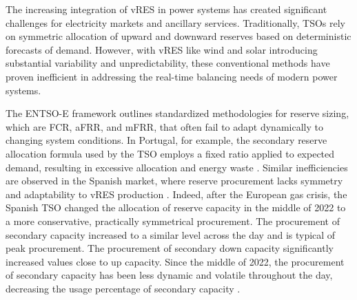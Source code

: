 The increasing integration of \gls{vRES} in power systems has created significant challenges for electricity markets and ancillary services. Traditionally, \gls{TSO}s rely on symmetric allocation of upward and downward reserves based on deterministic forecasts of demand. However, with \gls{vRES} like wind and solar introducing substantial variability and unpredictability, these conventional methods have proven inefficient in addressing the real-time balancing needs of modern power systems.\par
The \gls{ENTSO-E} framework \cite{handbook2009policy} outlines standardized methodologies for reserve sizing, which are \gls{FCR}, \gls{aFRR}, and \gls{mFRR}, that often fail to adapt dynamically to changing system conditions. In Portugal, for example, the secondary reserve allocation formula used by the \gls{TSO} employs a fixed ratio applied to expected demand, resulting in excessive allocation and energy waste \cite{Frade:19c,Perissi2022}. Similar inefficiencies are observed in the Spanish market, where reserve procurement lacks symmetry and adaptability to \gls{vRES} production \cite{Algarvio:24,Cardo-Miota:23}.
%
\textcolor[rgb]{0,0,0.5}{Indeed, after the European gas crisis, the Spanish TSO changed the allocation of reserve capacity in the middle of 2022 to a more conservative, practically symmetrical procurement. The procurement of secondary capacity increased to a similar level across the day and is typical of peak procurement. The procurement of secondary down capacity significantly increased values close to up capacity. Since the middle of 2022, the procurement of secondary capacity has been less dynamic and volatile throughout the day, decreasing the usage percentage of secondary capacity \cite{Algarvio:24,Cardo-Miota:23}.}
%

